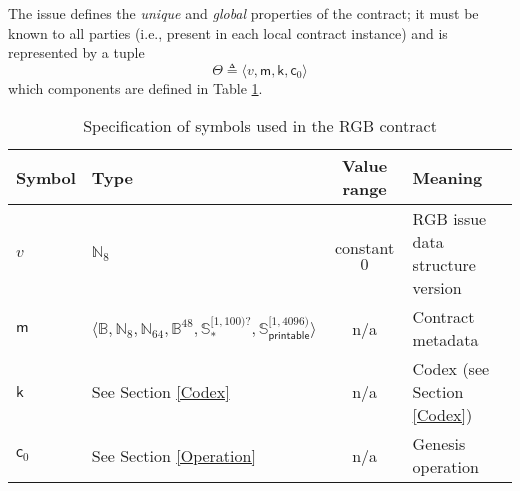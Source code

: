 \documentclass[9pt,oneside]{amsart}
\begin{document}
\begin{multicols}{2}
The \gls{issue} defines the \emph{unique} and \emph{global} properties of the contract;
it must be known to all parties (i.e., present in each \gls{local contract} instance) and
is represented by a tuple
\noindent
\begin{equation}\label{eq:issue}
\mathsf{\Theta} \triangleq \langle v, \mathsf{m}, \mathsf{k}, \mathsf{c}_0 \rangle
\end{equation}
\noindent
which components are defined in Table \ref{tab:contract}.

\end{multicols}
\begin{table}[h]
\centering
\caption{Specification of symbols used in the RGB contract}\label{tab:contract}
\begin{tabular}{ l l c l }
\toprule
Symbol & Type & Value range & Meaning \\
\midrule
$v$ & $\mathbb{N}_8$ & constant $0$ & RGB issue data structure version \\
$\mathsf{m}$   & $\langle \mathbb{B}, \mathbb{N}_8, \mathbb{N}_{64}, \mathbb{B}^{48}, \mathbb{S}_*^{[1, 100)?}, \mathbb{S}_\mathsf{printable}^{[1, 4096)} \rangle$ & n/a & Contract metadata \\
$\mathsf{k}$   & See Section \ref{Codex} & n/a & Codex (see Section \ref{Codex}) \\
$\mathsf{c}_0$ & See Section \ref{Operation} & n/a & Genesis operation \\
\bottomrule
\end{tabular}
\end{table}
\end{document}
